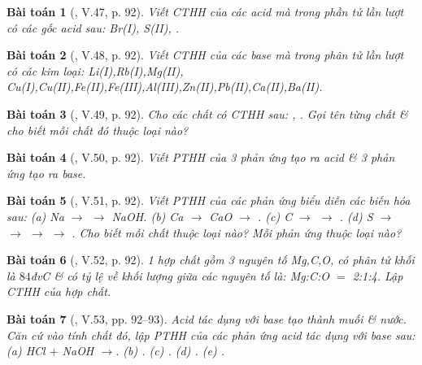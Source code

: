 \documentclass{article}
\newtheorem{baitoan}{Bài toán}
\begin{document}
\begin{baitoan}[\cite{Truong_BTNC_Hoa_Hoc_8_2022}, V.47, p. 92]
	Viết CTHH của các acid mà trong phần tử lần lượt có các gốc acid sau: \emph{Br(I), S(II), }.
\end{baitoan}

\begin{baitoan}[\cite{Truong_BTNC_Hoa_Hoc_8_2022}, V.48, p. 92]
	Viết CTHH của các base mà trong phân tử lần lượt có các kim loại: \emph{Li(I),Rb(I),Mg(II), Cu(I),Cu(II),Fe(II),Fe(III),Al(III),Zn(II),Pb(II),Ca(II),Ba(II)}.
\end{baitoan}

\begin{baitoan}[\cite{Truong_BTNC_Hoa_Hoc_8_2022}, V.49, p. 92]
	Cho các chất có CTHH sau: \emph{, }. Gọi tên từng chất \& cho biết mỗi chất đó thuộc loại nào?
\end{baitoan}

\begin{baitoan}[\cite{Truong_BTNC_Hoa_Hoc_8_2022}, V.50, p. 92]
	Viết PTHH của 3 phản ứng tạo ra acid \& 3 phản ứng tạo ra base.
\end{baitoan}

\begin{baitoan}[\cite{Truong_BTNC_Hoa_Hoc_8_2022}, V.51, p. 92]
	Viết PTHH của các phản ứng biểu diễn các biến hóa sau: (a) \emph{Na $\to$  $\to$ NaOH}. (b) \emph{Ca $\to$ CaO $\to$ }. (c) \emph{C $\to$  $\to$ }. (d) \emph{S $\to$  $\to$  $\to$  $\to$ }. Cho biết mỗi chất thuộc loại nào? Mỗi phản ứng thuộc loại nào?
\end{baitoan}

\begin{baitoan}[\cite{Truong_BTNC_Hoa_Hoc_8_2022}, V.52, p. 92]
	1 hợp chất gồm 3 nguyên tố \emph{Mg,C,O}, có phân tử khối là $84$đvC \& có tỷ lệ về khối lượng giữa các nguyên tố là: \emph{Mg:C:O $=$ 2:1:4}. Lập CTHH của hợp chất.
\end{baitoan}

\begin{baitoan}[\cite{Truong_BTNC_Hoa_Hoc_8_2022}, V.53, pp. 92--93]
	Acid tác dụng với base tạo thành muối \& nước. Căn cứ vào tính chất đó, lập PTHH của các phản ứng acid tác dụng với base sau: (a) \emph{HCl $+$ NaOH} $\to$. (b) \emph{}. (c) \emph{}. (d) \emph{}. (e) \emph{}.
\end{baitoan}
\end{document}
